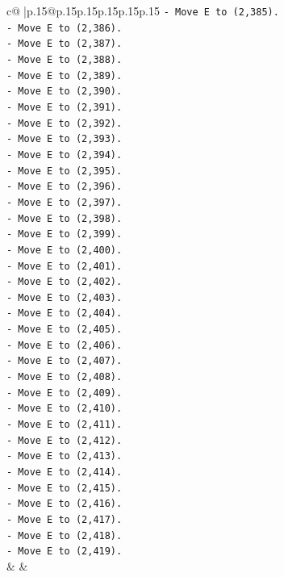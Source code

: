 \documentclass{article}
\begin{document}
{\begin{supertabular}{c@{$\;$}|p{.15\linewidth}@{}p{.15\linewidth}p{.15\linewidth}p{.15\linewidth}p{.15\linewidth}p{.15\linewidth}}
{{{\texttt{{-} Move E to (2,385).} \\
\texttt{{-} Move E to (2,386).} \\
\texttt{{-} Move E to (2,387).} \\
\texttt{{-} Move E to (2,388).} \\
\texttt{{-} Move E to (2,389).} \\
\texttt{{-} Move E to (2,390).} \\
\texttt{{-} Move E to (2,391).} \\
\texttt{{-} Move E to (2,392).} \\
\texttt{{-} Move E to (2,393).} \\
\texttt{{-} Move E to (2,394).} \\
\texttt{{-} Move E to (2,395).} \\
\texttt{{-} Move E to (2,396).} \\
\texttt{{-} Move E to (2,397).} \\
\texttt{{-} Move E to (2,398).} \\
\texttt{{-} Move E to (2,399).} \\
\texttt{{-} Move E to (2,400).} \\
\texttt{{-} Move E to (2,401).} \\
\texttt{{-} Move E to (2,402).} \\
\texttt{{-} Move E to (2,403).} \\
\texttt{{-} Move E to (2,404).} \\
\texttt{{-} Move E to (2,405).} \\
\texttt{{-} Move E to (2,406).} \\
\texttt{{-} Move E to (2,407).} \\
\texttt{{-} Move E to (2,408).} \\
\texttt{{-} Move E to (2,409).} \\
\texttt{{-} Move E to (2,410).} \\
\texttt{{-} Move E to (2,411).} \\
\texttt{{-} Move E to (2,412).} \\
\texttt{{-} Move E to (2,413).} \\
\texttt{{-} Move E to (2,414).} \\
\texttt{{-} Move E to (2,415).} \\
\texttt{{-} Move E to (2,416).} \\
\texttt{{-} Move E to (2,417).} \\
\texttt{{-} Move E to (2,418).} \\
\texttt{{-} Move E to (2,419).} \\
            }
        }
    }
    & & \\ \\


\end{supertabular}}
\end{document}
